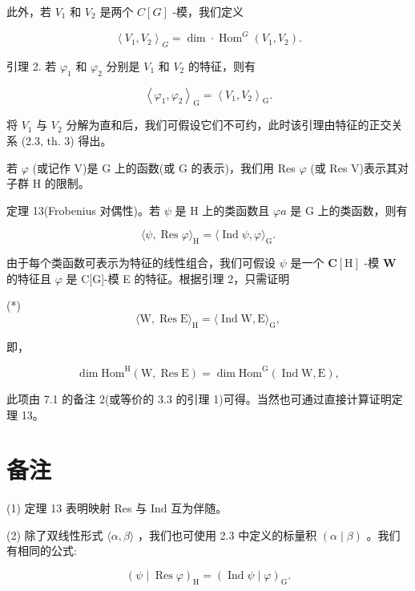 \documentclass[10pt]{article}
\begin{document}
此外，若 \({V}_{1}\) 和 \({V}_{2}\) 是两个 \(C\left\lbrack  G\right\rbrack\) -模，我们定义

\[
{\left\langle  {V}_{1},{V}_{2}\right\rangle  }_{G} = \dim  \cdot  {\operatorname{Hom}}^{G}\left( {{V}_{1},{V}_{2}}\right) .
\]

引理 2. 若 \({\varphi }_{1}\) 和 \({\varphi }_{2}\) 分别是 \({V}_{1}\) 和 \({V}_{2}\) 的特征，则有

\[
{\left\langle  {\varphi }_{1},{\varphi }_{2}\right\rangle  }_{\mathrm{G}} = {\left\langle  {V}_{1},{V}_{2}\right\rangle  }_{\mathrm{G}}.
\]

将 \({V}_{1}\) 与 \({V}_{2}\) 分解为直和后，我们可假设它们不可约，此时该引理由特征的正交关系 (2.3, th. 3) 得出。

若 \(\varphi\) (或记作 V)是 G 上的函数(或 G 的表示)，我们用 Res \(\varphi\) (或 Res V)表示其对子群 H 的限制。

定理 13(Frobenius 对偶性)。若 \(\psi\) 是 \(\mathrm{H}\) 上的类函数且 \({\varphi a}\) 是 \(\mathrm{G}\) 上的类函数，则有

\[
\langle \psi ,\operatorname{Res}\varphi {\rangle }_{\mathrm{H}} = \langle \operatorname{Ind}\psi ,\varphi {\rangle }_{\mathrm{G}}.
\]

由于每个类函数可表示为特征的线性组合，我们可假设 \(\psi\) 是一个 \(\mathbf{C}\left\lbrack  \mathrm{H}\right\rbrack\) -模 \(\mathbf{W}\) 的特征且 \(\varphi\) 是 C[G]-模 E 的特征。根据引理 2，只需证明

(*)
\[
\langle \mathrm{W},\operatorname{Res}\mathrm{E}{\rangle }_{\mathrm{H}} = \langle \operatorname{Ind}\mathrm{W},\mathrm{E}{\rangle }_{\mathrm{G}},
\]

即，

\[
\dim {\mathrm{{Hom}}}^{\mathrm{H}}\left( {\mathrm{W},\operatorname{Res}\mathrm{E}}\right)  = \dim {\mathrm{{Hom}}}^{\mathrm{G}}\left( {\operatorname{Ind}\mathrm{W},\mathrm{E}}\right) ,
\]

此项由 7.1 的备注 2(或等价的 3.3 的引理 1)可得。当然也可通过直接计算证明定理 13。

\section*{备注}

(1) 定理 13 表明映射 Res 与 Ind 互为伴随。

(2) 除了双线性形式 \(\langle \alpha ,\beta \rangle\) ，我们也可使用 2.3 中定义的标量积 \(\left( {\alpha  \mid  \beta }\right)\) 。我们有相同的公式:

\[
{\left( \psi  \mid  \operatorname{Res}\varphi \right) }_{\mathrm{H}} = {\left( \operatorname{Ind}\psi  \mid  \varphi \right) }_{\mathrm{G}}.
\]
\end{document}
